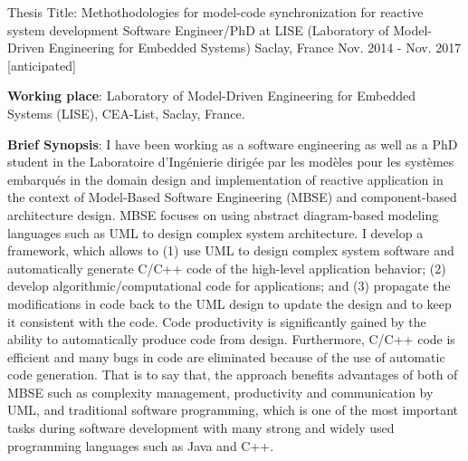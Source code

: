 


\begin{cventries}


\cventry
{Thesis Title: Methothodologies for model-code synchronization for reactive system development} %
{Software Engineer/PhD at LISE (Laboratory of Model-Driven Engineering for Embedded Systems)} %
{Saclay, France} %
{Nov. 2014 - Nov. 2017 [anticipated]} %
{ %
	\begin{cvitems}
		\item {\textbf{Working place}: Laboratory of Model-Driven Engineering for Embedded Systems (LISE), CEA-List, Saclay, France.}	
		\item {\textbf{Brief Synopsis}: I have been working as a software engineering as well as a PhD student in the Laboratoire d'Ingénierie dirigée par les modèles pour les systèmes embarqués in the domain design and implementation of reactive application in the context of Model-Based Software Engineering (MBSE) and component-based architecture design. 
		MBSE focuses on using abstract diagram-based modeling languages such as UML to design complex system architecture. 
		I develop a framework, which allows to (1) use UML to design complex system software and automatically generate C/C++ code of the high-level application behavior; (2) develop algorithmic/computational code for applications; and (3) propagate the modifications in code back to the UML design to update the design and to keep it consistent with the code. 
		Code productivity is significantly gained by the ability to automatically produce code from design. Furthermore, C/C++ code is efficient and many bugs in code are eliminated because of the use of automatic code generation. That is to say that, the approach benefits advantages of both of MBSE such as complexity management, productivity  and communication by UML, and traditional software programming, which is one of the most important tasks during software development with many strong and widely used programming languages such as Java and C++.  
}
\end{cvitems}}
\end{cventries}

